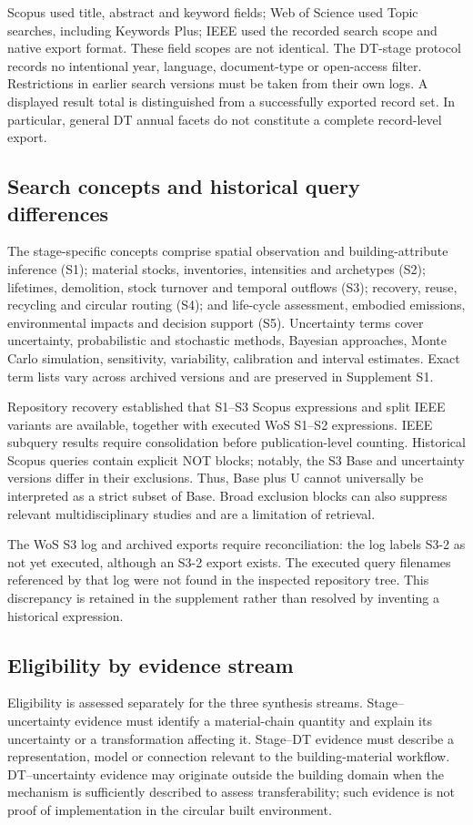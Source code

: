 Scopus used title, abstract and keyword fields; Web of Science used Topic searches, including Keywords Plus; IEEE used the recorded search scope and native export format. These field scopes are not identical. The DT-stage protocol records no intentional year, language, document-type or open-access filter. Restrictions in earlier search versions must be taken from their own logs. A displayed result total is distinguished from a successfully exported record set. In particular, general DT annual facets do not constitute a complete record-level export.

\subsection{Search concepts and historical query differences}
The stage-specific concepts comprise spatial observation and building-attribute inference (S1); material stocks, inventories, intensities and archetypes (S2); lifetimes, demolition, stock turnover and temporal outflows (S3); recovery, reuse, recycling and circular routing (S4); and life-cycle assessment, embodied emissions, environmental impacts and decision support (S5). Uncertainty terms cover uncertainty, probabilistic and stochastic methods, Bayesian approaches, Monte Carlo simulation, sensitivity, variability, calibration and interval estimates. Exact term lists vary across archived versions and are preserved in Supplement S1.

Repository recovery established that S1--S3 Scopus expressions and split IEEE variants are available, together with executed WoS S1--S2 expressions. IEEE subquery results require consolidation before publication-level counting. Historical Scopus queries contain explicit NOT blocks; notably, the S3 Base and uncertainty versions differ in their exclusions. Thus, Base plus U cannot universally be interpreted as a strict subset of Base. Broad exclusion blocks can also suppress relevant multidisciplinary studies and are a limitation of retrieval.

The WoS S3 log and archived exports require reconciliation: the log labels S3-2 as not yet executed, although an S3-2 export exists. The executed query filenames referenced by that log were not found in the inspected repository tree. This discrepancy is retained in the supplement rather than resolved by inventing a historical expression.

\subsection{Eligibility by evidence stream}
Eligibility is assessed separately for the three synthesis streams. Stage--uncertainty evidence must identify a material-chain quantity and explain its uncertainty or a transformation affecting it. Stage--DT evidence must describe a representation, model or connection relevant to the building-material workflow. DT--uncertainty evidence may originate outside the building domain when the mechanism is sufficiently described to assess transferability; such evidence is not proof of implementation in the circular built environment.

